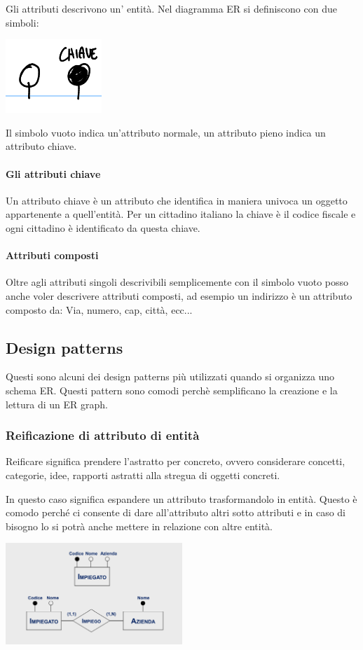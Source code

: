 Gli attributi descrivono un' entità. Nel diagramma ER si definiscono con due simboli:

\includegraphics{img/attributi.png}

Il simbolo vuoto indica un'attributo normale, un attributo pieno indica un attributo chiave.

\paragraph{Gli attributi chiave} Un attributo chiave è un attributo che identifica in maniera univoca un oggetto appartenente a quell'entità. Per un cittadino italiano la chiave è il codice fiscale e ogni cittadino è identificato da questa chiave.

\paragraph{Attributi composti} Oltre agli attributi singoli descrivibili semplicemente con il simbolo vuoto posso anche voler descrivere attributi composti, ad esempio un indirizzo è un attributo composto da: Via, numero, cap, città, ecc...


\subsection{Design patterns}
Questi sono alcuni dei design patterns più utilizzati quando si organizza uno schema ER. Questi pattern sono comodi perchè semplificano la creazione e la lettura di un ER graph.

\subsubsection{Reificazione di attributo di entità}
Reificare significa prendere l'astratto per concreto, ovvero considerare concetti, categorie, idee, rapporti astratti alla stregua di oggetti concreti.

In questo caso significa espandere un attributo trasformandolo in entità. Questo è comodo perché ci consente di dare all'attributo altri sotto attributi e in caso di bisogno lo si potrà anche mettere in relazione con altre entità.
\begin{center}
\includegraphics[width=0.5\textwidth]{img/reificazioneDiAttributoDiEntita.png}
\end{center}

